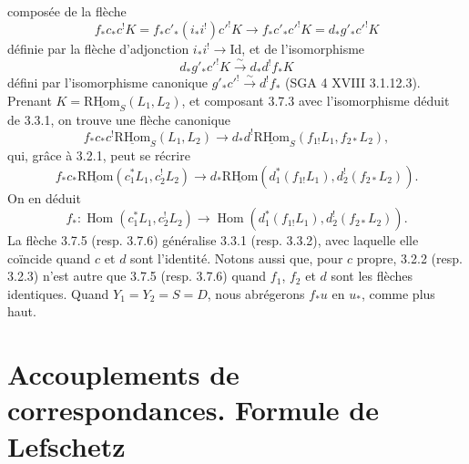 \documentclass[11pt]{article}
\DeclareMathOperator{\Hom}{Hom}
\newcommand{\R}{\mathrm{R}}\newcommand{\RHomCore}{\mathrm{RHom}}
\providecommand{\RHom}{\RHomCore}
\providecommand{\uRHom}{\underline{\RHom}}
\providecommand{\Id}{\mathrm{Id}}
\providecommand{\RHom}{\RHomCore}
\providecommand{\Hom}{\operatorname{Hom}}
\providecommand{\RHom}{\R\mathcal{H}om}
\providecommand{\R}{\mathrm R}
\providecommand{\RHom}{\RHomCore}
\providecommand{\Hom}{\operatorname{Hom}}
\begin{document}
composée de la flèche
\[
f_*c_*c^!K=f_*c'_*(i_*i^!)c'^!K\longrightarrow f_*c'_*c'^!K=d_*g'_*c'^!K
\]
définie par la flèche d'adjonction $i_*i^!\to\Id$, et de l'isomorphisme
\[
d_*g'_*c'^!K\xrightarrow{\sim}d_*d^!f_*K
\]
défini par l'isomorphisme canonique $g'_*c'^!\xrightarrow{\sim}d^!f_*$ (SGA 4 XVIII 3.1.12.3). Prenant $K=\uRHom_S(L_1,L_2)$, et composant 3.7.3 avec l'isomorphisme déduit de 3.3.1, on trouve une flèche canonique
\begin{equation}
f_*c_*c^!\uRHom_S(L_1,L_2)
\longrightarrow
 d_*d^!\uRHom_S(f_{1!}L_1,f_{2*}L_2),
\tag{3.7.4}
\end{equation}
qui, grâce à 3.2.1, peut se récrire
\begin{equation}
f_*c_*\uRHom(c_1^*L_1,c_2^!L_2)
\longrightarrow
 d_*\uRHom(d_1^*(f_{1!}L_1),d_2^!(f_{2*}L_2)).
\tag{3.7.5}
\end{equation}
On en déduit
\begin{equation}
f_*:\Hom(c_1^*L_1,c_2^!L_2)
\longrightarrow
\Hom(d_1^*(f_{1!}L_1),d_2^!(f_{2*}L_2)).
\tag{3.7.6}
\end{equation}
La flèche 3.7.5 (resp. 3.7.6) généralise 3.3.1 (resp. 3.3.2), avec laquelle elle coïncide quand $c$ et $d$ sont l'identité. Notons aussi que, pour $c$ propre, 3.2.2 (resp. 3.2.3) n'est autre que 3.7.5 (resp. 3.7.6) quand $f_1$, $f_2$ et $d$ sont les flèches identiques. Quand $Y_1=Y_2=S=D$, nous abrégerons $f_*u$ en $u_*$, comme plus haut.

\section{Accouplements de correspondances. Formule de Lefschetz}
\end{document}
